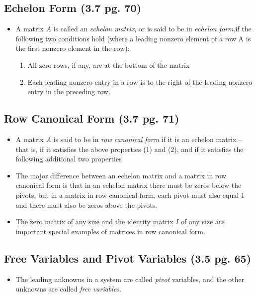 \documentclass[hidelinks, 11pt, openleft]{scrartcl}
\begin{document}
\subsection*{Echelon Form (3.7 pg. 70)}
\begin{itemize}
    \item A matrix $A$ is called an \textit{echelon matrix}, or is said to be in \textit{echelon form},if the following two conditions hold (where a leading nonzero element of a row A is the first nonzero element in the row):
    \begin{enumerate}
        \item All zero rows, if any, are at the bottom of the matrix
        \item Each leading nonzero entry in a row is to the right of the leading nonzero entry in the preceding row. 
    \end{enumerate}
\end{itemize}

\subsection*{Row Canonical Form (3.7 pg. 71)}
\begin{itemize}
    \item A matrix $A$ is said to be in \textit{row canonical form} if it is an echelon matrix -- that is, if it satisfies the above properties (1) and (2), and if it satisfies the following additional two properties 
    \item The major difference between an echelon matrix and a matrix in row canonical form is that in an echelon matrix there must be zeros below the pivots, but in a matrix in row canonical form, each pivot must also equal 1 and there must also be zeros above the pivots. 
    \item The zero matrix of any size and the identity matrix $I$ of any size are important special examples of matrices in row canonical form. 
\end{itemize}

\subsection*{Free Variables and Pivot Variables (3.5 pg. 65)}
\begin{itemize}
    \item The leading unknowns in a system are called \textit{pivot} variables, and the other unknowns are called \textit{free variables}.
\end{itemize}
\end{document}
